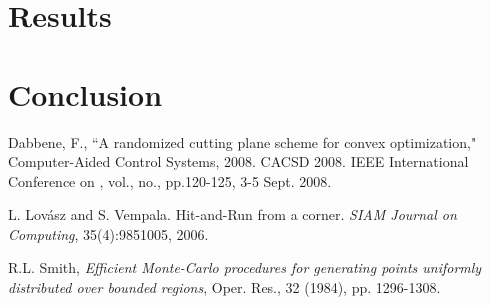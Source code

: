 \documentclass[11pt]{article}
\begin{document}
\section{Results}

\section{Conclusion}

\pagebreak

\begin{thebibliography}{99}

 Dabbene, F., ``A randomized cutting plane scheme for convex optimization," Computer-Aided Control Systems, 2008. CACSD 2008. IEEE International Conference on , vol., no., pp.120-125, 3-5 Sept. 2008.

 L. Lov\'asz and S. Vempala. Hit-and-Run from a corner. \emph{SIAM Journal on Computing}, 35(4):9851005, 2006.

 R.L. Smith, \emph{Efficient Monte-Carlo procedures for generating points uniformly distributed over
bounded regions}, Oper. Res., 32 (1984), pp. 1296-1308.

\end{thebibliography}
\end{document}
